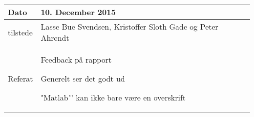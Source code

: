 \begin{center}
	\begin{tabular}{| l | p{10cm} |}
		\hline
		Dato		& 10. December 2015\\ \hline
		tilstede 	& Lasse Bue Svendsen, Kristoffer Sloth Gade og Peter Ahrendt\\ \hline
		Referat		& \vspace{-5mm}\begin{myEnumerate}
			\item Feedback på rapport
			\begin{myItemize}
				\item Generelt ser det godt ud
				\item "Matlab"' kan ikke bare være en overskrift
			\end{myItemize}
			
		\end{myEnumerate}\\ 	
		\hline
	\end{tabular}
\end{center}